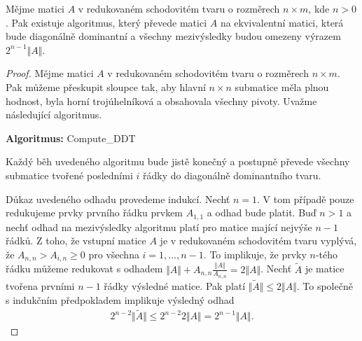 \begin{lem}
Mějme matici $ A $ v redukovaném schodovitém tvaru o rozměrech $ n \times m $,
kde $ n > 0 $.
Pak existuje algoritmus, který převede matici $ A $ na ekvivalentní matici, 
která bude diagonálně dominantní a všechny mezivýsledky budou omezeny výrazem
$ 2^{n - 1} \Vert A \Vert $.
\end{lem}
\begin{proof}
Mějme matici $ A $ v redukovaném schodovitém tvaru o rozměrech $ n \times m $. 
Pak můžeme přeskupit sloupce tak, aby hlavní $ n \times n $ submatice měla plnou
hodnost, byla horní trojúhelníková a obsahovala všechny pivoty. Uvažme 
následující algoritmus.\\
%
    \begin{algorithm} \label{DDT_Algo}
    {
        \textbf{Algoritmus:} Compute\_DDT
    }



    \end{algorithm} 

Každý běh uvedeného algoritmu bude jistě konečný a postupně převede všechny 
submatice tvořené posledními $ i $ řádky do diagonálně dominantního tvaru.

Důkaz uvedeného odhadu provedeme indukcí. Nechť $ n = 1 $. V tom případě pouze
redukujeme prvky prvního řádku prvkem $ A_{1,1} $ a odhad bude platit.
Buď $ n > 1 $ a nechť odhad na mezivýsledky algoritmu platí pro matice mající
nejvýše $ n - 1 $ řádků. Z toho, že vstupní matice $ A $ je v redukovaném 
schodovitém tvaru vyplývá, že $ A_{n,n} > A_{i, n} \geq 0 $ pro všechna 
$ i = 1, \dots, n - 1 $. To implikuje, že prvky $ n $-tého řádku můžeme redukovat
s odhadem $ \Vert A \Vert + A_{n,n} \frac{\Vert A \Vert} {A_{n,n}} = 2 \Vert A \Vert $.
Nechť $ \tilde{A} $ je matice tvořena prvními $ n - 1 $ řádky výsledné matice.
Pak platí $ \Vert \tilde{A} \Vert \leq 2 \Vert A \Vert $. To společně s
indukčním předpokladem implikuje výsledný odhad 
\begin{align*}
    2^{n - 2} \Vert \tilde{A} \Vert 
        \leq 2^{n - 2} 2 \Vert A \Vert 
        = 2^{n - 1} \Vert A \Vert.
\end{align*}
\end{proof}




